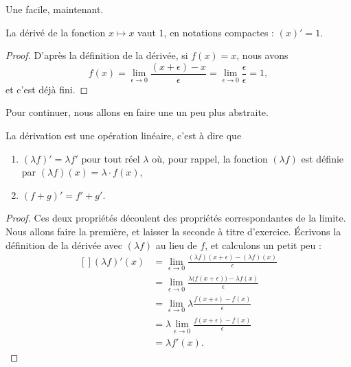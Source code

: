 Une facile, maintenant.
\begin{proposition}
    La dérivé de la fonction $x\mapsto x$ vaut $1$, en notations compactes : $(x)'=1$.
\end{proposition}

\begin{proof}
D'après la définition de la dérivée, si $f(x)=x$, nous avons
\begin{equation}
    f(x)=\lim_{\epsilon\to 0}\frac{ (x+\epsilon) -x }{\epsilon} =\lim_{\epsilon\to 0}\frac{ \epsilon }{\epsilon} =1,
\end{equation}
et c'est déjà fini.
\end{proof}

Pour continuer, nous allons en faire une un peu plus abstraite.
\begin{proposition}     \label{PropDerrLin}
    La dérivation est une opération linéaire, c'est à dire que
    \begin{enumerate}
        \item $(\lambda f)'=\lambda f'$ pour tout réel $\lambda$ où, pour rappel, la fonction $(\lambda f)$ est définie par $(\lambda f)(x)=\lambda\cdot f(x)$,
        \item $(f+g)'=f'+g'$.
    \end{enumerate}
\end{proposition}

\begin{proof}
Ces deux propriétés découlent des propriétés correspondantes de la limite. Nous allons faire la première, et laisser la seconde à titre d'exercice. Écrivons la définition de la dérivée avec $(\lambda f)$ au lieu de $f$, et calculons un petit peu :
\begin{equation}
    \begin{aligned}[]
        (\lambda f)'(x) &=\lim_{\epsilon\to 0}\frac{ (\lambda f)(x+\epsilon)-(\lambda f)(x) }{ \epsilon }\\
                &=\lim_{\epsilon\to 0}\frac{ \lambda \big( f(x+\epsilon) \big)-\lambda f(x) }{ \epsilon }\\
                &=\lim_{\epsilon\to 0}\lambda \frac{ f(x+\epsilon) -f(x) }{ \epsilon }\\
                &=\lambda \lim_{\epsilon\to 0}\frac{ f(x+\epsilon) -f(x) }{ \epsilon }\\
                &=\lambda f'(x).
    \end{aligned}
\end{equation}
\end{proof}


